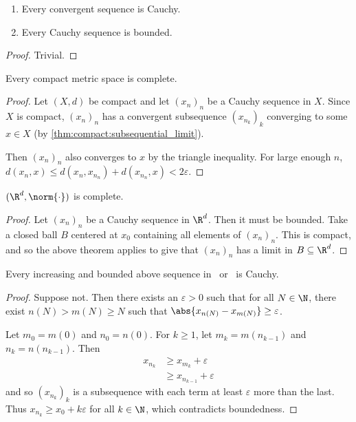 \begin{theorem} \leavevmode
    \begin{enumerate}[label=(\alph*)]
        \item Every convergent sequence is Cauchy.
        \item Every Cauchy sequence is bounded.
    \end{enumerate}
\end{theorem}
\begin{proof}
    Trivial.
\end{proof}

\begin{theorem}
    Every compact metric space is complete.
\end{theorem}
\begin{proof}
    Let $(X, d)$ be compact and let $(x_n)_n$ be a Cauchy sequence in $X$.
    Since $X$ is compact, $(x_n)_n$ has a convergent subsequence
    $(x_{n_k})_k$ converging to some $x \in X$
    (by \cref{thm:compact:subsequential_limit}).

    Then $(x_n)_n$ also converges to $x$ by the triangle inequality.
    For large enough $n$, $d(x_n, x) \le d(x_n, x_{n_n}) + d(x_{n_n}, x)
    < 2\varepsilon$.
\end{proof}
\begin{theorem}
    $(\R^d, \norm{\cdot})$ is complete.
\end{theorem}
\begin{proof}
    Let $(x_n)_n$ be a Cauchy sequence in $\R^d$.
    Then it must be bounded.
    Take a closed ball $B$ centered at $x_0$ containing all elements of
    $(x_n)_n$.
    This is compact, and so the above theorem applies to give that
    $(x_n)_n$ has a limit in $B \subseteq \R^d$.
\end{proof}

\begin{exercise}
    Every increasing and bounded above sequence in \Q\ or \R\ is Cauchy.
\end{exercise}
\begin{proof}
    Suppose not.
    Then there exists an $\varepsilon > 0$ such that for all $N \in \N$,
    there exist $n(N) > m(N) \ge N$ such that
    $\abs{x_{n(N)} - x_{m(N)}} \ge \varepsilon$.

    Let $m_0 = m(0)$ and $n_0 = n(0)$.
    For $k \ge 1$, let $m_k = m(n_{k-1})$ and $n_k = n(n_{k-1})$.
    Then \begin{align*}
        x_{n_k} &\ge x_{m_k} + \varepsilon \\
               &\ge x_{n_{k-1}} + \varepsilon
    \end{align*} and so $(x_{n_k})_k$ is a subsequence with each term at
    least $\varepsilon$ more than the last.
    Thus $x_{n_k} \ge x_0 + k\varepsilon$ for all $k \in \N$, which
    contradicts boundedness.
\end{proof}
